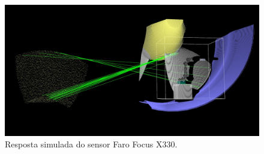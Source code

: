 \begin{figure}[H]
	\centering
	\includegraphics[width=0.9\columnwidth]{figs/calibracao/sim_mh12}
	\caption{Resposta simulada do sensor Faro Focus X330.}
    \label{fig::sim_mh12}
\end{figure}	
